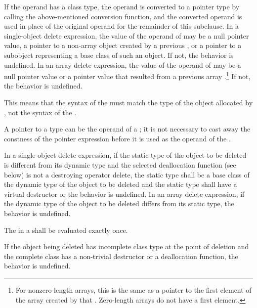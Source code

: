 \pnum
{}%
If the operand has a class type, the operand is converted to a pointer
type by calling the above-mentioned conversion function, and the
converted operand is used in place of the original operand for the
remainder of this subclause.
In a single-object delete expression, the value of the operand of
 may be a null pointer value, a pointer to a non-array object
created by a previous ,
or a pointer to a
subobject representing a base class of such an
object. If not, the behavior is undefined.
%
In an array delete expression, the value of the operand of 
may be a null pointer value or a pointer value that resulted from
a previous array .\footnote{For nonzero-length
arrays, this is the same as a pointer to the first
element of the array created by that .
Zero-length arrays do not have a first element.}
If not, the behavior is undefined.
\begin{note}
This means that the syntax of the  must
match the type of the object allocated by , not the syntax of the
.
\end{note}
\begin{note}
A pointer to a  type can be the operand of a
; it is not necessary to cast away the
constness of the pointer expression before it is
used as the operand of the .
\end{note}

\pnum
{}%
In a single-object delete expression, if the static type of the object to be
deleted is different from its dynamic type
and the selected deallocation function (see below)
is not a destroying operator delete,
the static type shall be a base
class of the dynamic type of the object to be deleted and the static type shall
have a virtual destructor or the behavior is undefined. In an array delete
expression, if the dynamic type of the object to be deleted differs from its
static type, the behavior is undefined.

\pnum
The  in a  shall
be evaluated exactly once.

\pnum
{}%
If the object being deleted has incomplete class type at the point of
deletion and the complete class has a non-trivial destructor or a
deallocation function, the behavior is undefined.

